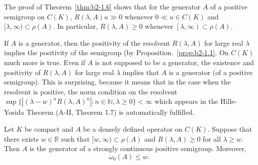 \begin{remark}\label{rem:b2-1.7}
The proof of Theorem~\ref{thm:b2-1.6} shows that for the generator $A$ of a positive semigroup on $C(K)$, $R(\lambda,A)u \gg 0$ whenever $0 \ll u \in C(K)$ and $[\lambda,\infty) \subset \rho(A)$.
In particular, $R(\lambda,A) \geq 0$ whenever $\left[\lambda,\infty\right) \subset \rho(A)$.
\end{remark}

If $A$ is a generator, then the positivity of the resolvent $R(\lambda,A)$ for large real $\lambda$ implies the positivity of the semigroup (by Proposition.~\ref{prop:b2-1.1}.
On $C(K)$ much more is true.
Even if $A$ is not supposed to be a generator, the existence and positivity of $R(\lambda,A)$ for large real $\lambda$ implies that $A$ is a generator (of a positive semigroup).
This is surprising, because it means that in the case when the resolvent is positive, the norm condition on the resolvent $\sup \{|(\lambda-w)^{n}R(\lambda,A)^{n}| : n \in \mathbb{N}, \lambda \geq 0\} < \infty$ which appears in the Hille-Yosida Theorem (A-II, Theorem 1.7) is automatically fulfilled.

\begin{theorem}\label{thm:b2-1.8}
Let $K$ be compact and $A$ be a densely defined operator on $C(K)$.
Suppose that there exists $w \in \mathbb{R}$ such that $[w,\infty) \subset \rho(A)$ and $R(\lambda,A) \geq 0$ for all $\lambda \geq w$.
Then $A$ is the generator of a strongly continuous positive semigroup.
Moreover,
\begin{equation}\label{eq:b2-1.3}
    \omega_{0}(A) \leq w.
\end{equation}
\end{theorem}


